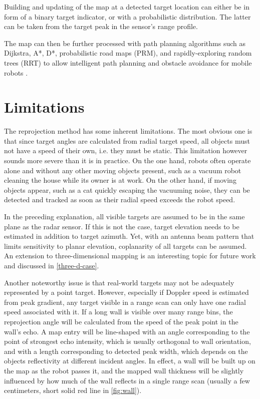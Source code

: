 Building and updating of the map at a detected target location can either be in form of a binary target indicator, or with a probabilistic distribution. The latter can be taken from the target peak in the sensor's range profile.

The map can then be further processed with path planning algorithms such as Dijkstra, A*, D*, probabilistic road maps (PRM), and rapidly-exploring random trees (RRT) to allow intelligent path planning and obstacle avoidance for mobile robots \cite{Correll2016}.

\section{Limitations}\label{limitations}

The reprojection method has some inherent limitations. The most obvious one is that since target angles are calculated from radial target speed, all objects must not have a speed of their own, i.e. they must be static. This limitation however sounds more severe than it is in practice. On the one hand, robots often operate alone and without any other moving objects present, such as a vacuum robot cleaning the house while its owner is at work. On the other hand, if moving objects appear, such as a cat quickly escaping the vacuuming noise, they can be detected and tracked as soon as their radial speed exceeds the robot speed.

In the preceding explanation, all visible targets are assumed to be in the same plane as the radar sensor. If this is not the case, target elevation needs to be estimated in addition to target azimuth. Yet, with an antenna beam pattern that limits sensitivity to planar elevation, coplanarity of all targets can be assumed. An extension to three-dimensional mapping is an interesting topic for future work and discussed in \cref{three-d-case}.

Another noteworthy issue is that real-world targets may not be adequately represented by a point target. However, especially if Doppler speed is estimated from peak gradient, any target visible in a range scan can only have one radial speed associated with it. If a long wall is visible over many range bins, the reprojection angle will be calculated from the speed of the peak point in the wall's echo. A map entry will be line-shaped with an angle corresponding to the point of strongest echo intensity, which is usually orthogonal to wall orientation, and with a length corresponding to detected peak width, which depends on the objects reflectivity at different incident angles. In effect, a wall will be built up on the map as the robot passes it, and the mapped wall thickness will be slightly influenced by how much of the wall reflects in a single range scan (usually a few centimeters, short solid red line in \cref{fig:wall}).

